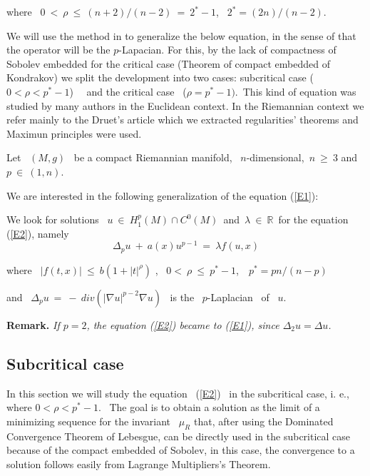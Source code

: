 \documentclass[12pt]{article}
\begin{document}
\noindent where \ $0\  < \ \rho \ \leq \ (n + 2)/(n - 2) \ = \ 2^{\ast}  -  1$, \ $2^{\ast}  =  (2n)/(n - 2)$. 

We will use the method in \cite{aubin3} to generalize the below equation, in the sense of that the operator will be the $p$-Lapacian.
 For this,
  by the lack of compactness of Sobolev embedded for the critical case (Theorem of compact embedded of Kondrakov)
we split the development into two cases: subcritical case
($ 0 < \rho < p^{\ast} - 1$) \  \ and the critical case \ ($\rho  =  p^{\ast}  -  1). $\ This kind of equation was studied by
  many authors in the  Euclidean context. In the Riemannian context we refer mainly to the Druet's article
\cite{druet4} which we extracted regularities' theorems and Maximun principles were used.

Let \ $(M,g)$ \ be a compact Riemannian manifold, \ $n$-dimensional,\ $n \ \geq \ 3$ and \ $p \ \in \ (1,n)$. 

We are interested in the following generalization of the equation (\ref{E1}):

\noindent  We look for solutions \ $u \ \in \ H^p_1(M)\cap C^0(M)$\  and\ $\lambda \ \in \ \mathbb{R}$\ for the equation (\ref{E2}), 
namely
\vspace{-0.5mm}
$$\Delta_p u \ + \ a(x)u^{p -1} \ = \ \lambda f(u,x) $$ 

\noindent  where \ $|f(t,x)| \ \leq \ b\left(1 + |t|^{\rho}\right)$ ,
 \ $0 < \ \rho \ \leq \ p^{\ast} -1$,\ \ $p^{\ast} = pn/(n - p)$ 

\noindent and \ $\Delta_p u \ = \ - \ div\left(|\nabla u|^{p - 2}\nabla u\right)$ \ is the \ $p$-Laplacian \ of \ $u$. 

{\bf Remark.} {\it If $p = 2$, the equation (\ref{E2}) became to (\ref{E1}), since $\Delta_2 u = \Delta u$.}

\subsection{Subcritical case}

In this section we will study the equation \ (\ref{E2}) \ in the subcritical case, i. e., where 
$ 0 <\rho <p^{\ast} - 1 $. \ The goal is to obtain a solution as the limit of a minimizing sequence for
the invariant \ $ \mu_R $  that, after using the Dominated Convergence Theorem of Lebesgue,  can be directly used
in the subcritical case because of the  compact embedded of Sobolev, in this case, the convergence to a solution follows
easily from  Lagrange Multipliers's Theorem.
\end{document}
